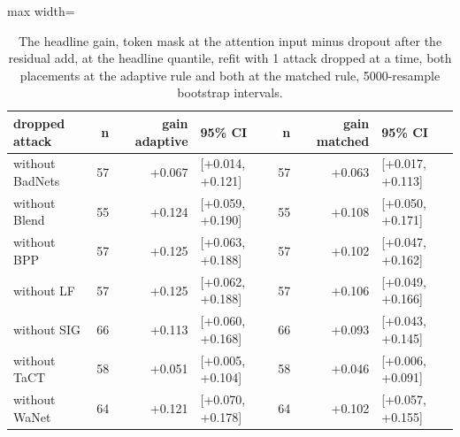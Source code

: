 \begin{table}[htbp]
\centering
\small
\caption{The headline gain, token mask at the attention input minus dropout after the residual add, at the headline quantile, refit with 1 attack dropped at a time, both placements at the adaptive rule and both at the matched rule, 5000-resample bootstrap intervals.}
\label{tab:headline-loo}
\begin{adjustbox}{max width=\linewidth}
\begin{tabular}{lrrlrrl}
\toprule
dropped attack & n & gain adaptive & 95\% CI & n & gain matched & 95\% CI \\
\midrule
without BadNets & 57 & +0.067 & [+0.014, +0.121] & 57 & +0.063 & [+0.017, +0.113] \\
without Blend & 55 & +0.124 & [+0.059, +0.190] & 55 & +0.108 & [+0.050, +0.171] \\
without BPP & 57 & +0.125 & [+0.063, +0.188] & 57 & +0.102 & [+0.047, +0.162] \\
without LF & 57 & +0.125 & [+0.062, +0.188] & 57 & +0.106 & [+0.049, +0.166] \\
without SIG & 66 & +0.113 & [+0.060, +0.168] & 66 & +0.093 & [+0.043, +0.145] \\
without TaCT & 58 & +0.051 & [+0.005, +0.104] & 58 & +0.046 & [+0.006, +0.091] \\
without WaNet & 64 & +0.121 & [+0.070, +0.178] & 64 & +0.102 & [+0.057, +0.155] \\
\bottomrule
\end{tabular}
\end{adjustbox}
\end{table}

